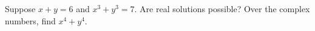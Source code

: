 Suppose $x+y=6$ and $x^3+y^3=7$. Are real solutions possible? Over the complex numbers, find $x^4+y^4$.
